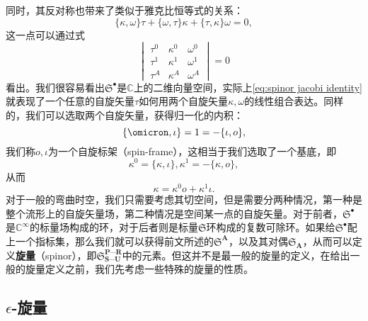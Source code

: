 同时，其反对称也带来了类似于雅克比恒等式的关系：
\begin{equation}
	\{\kappa ,\omega \} \tau +\{\omega ,\tau \} \kappa +\{\tau ,\kappa \} \omega =0,
	\label{eq:spinor jacobi identity}
\end{equation}
这一点可以通过式
\begin{equation*}
	\begin{vmatrix}
		\tau ^{0} & \kappa ^{0} & \omega ^{0}\\
		\tau ^{1} & \kappa ^{1} & \omega ^{1}\\
		\tau ^{A} & \kappa ^{A} & \omega ^{A}
	\end{vmatrix} =0
\end{equation*}
看出。我们很容易看出$\mathfrak{S}^{\bullet }$是$\mathbb{C}$上的二维向量空间，实际上\ref{eq:spinor jacobi identity}就表现了一个任意的自旋矢量$\tau $如何用两个自旋矢量$\kappa ,\omega $的线性组合表达。同样的，我们可以选取两个自旋矢量，获得归一化的内积：
\begin{equation*}
	\{\omicron ,\iota \} =1=-\{\iota ,o\} ,
\end{equation*}
我们称$o,\iota $为一个自旋标架（spin-frame），这相当于我们选取了一个基底，即
\begin{equation*}
	\kappa ^{0} =\{\kappa ,\iota \} ,\kappa ^{1} =-\{\kappa ,o\} ,
\end{equation*}
从而
\begin{equation*}
	\kappa =\kappa ^{0} o+\kappa ^{1} \iota .
\end{equation*}
对于一般的弯曲时空，我们只需要考虑其切空间，但是需要分两种情况，第一种是整个流形上的自旋矢量场，第二种情况是空间某一点的自旋矢量。对于前者，$\mathfrak{S}^{\bullet }$是$\mathbb{C}^{\infty }$的标量场构成的环，对于后者则是标量$\mathfrak{S}$环构成的复数可除环。如果给$\mathfrak{S}^{\bullet }$配上一个指标集，那么我们就可以获得前文所述的$\mathfrak{S}^{\boldsymbol{A}}$，以及其对偶$\mathfrak{S}_{\boldsymbol{A}}$，从而可以定义\textbf{旋量}（spinor），即$\mathfrak{S}_{\boldsymbol{S} \cdots \boldsymbol{U}}^{\boldsymbol{P} \cdots \boldsymbol{R}}$中的元素。但这并不是最一般的旋量的定义，在给出一般的旋量定义之前，我们先考虑一些特殊的旋量的性质。


\subsection{$\epsilon $-旋量}

